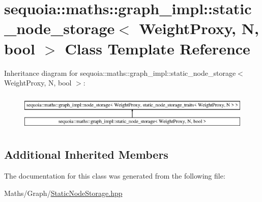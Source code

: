 \hypertarget{classsequoia_1_1maths_1_1graph__impl_1_1static__node__storage}{}\section{sequoia\+::maths\+::graph\+\_\+impl\+::static\+\_\+node\+\_\+storage$<$ Weight\+Proxy, N, bool $>$ Class Template Reference}
\label{classsequoia_1_1maths_1_1graph__impl_1_1static__node__storage}
Inheritance diagram for sequoia\+::maths\+::graph\+\_\+impl\+::static\+\_\+node\+\_\+storage$<$ Weight\+Proxy, N, bool $>$\+:\begin{figure}[H]
\begin{center}
\leavevmode
\includegraphics[height=1.818182cm]{classsequoia_1_1maths_1_1graph__impl_1_1static__node__storage}
\end{center}
\end{figure}
\subsection*{Additional Inherited Members}


The documentation for this class was generated from the following file\+:\begin{DoxyCompactItemize}
\item 
Maths/\+Graph/\mbox{\hyperlink{_static_node_storage_8hpp}{Static\+Node\+Storage.\+hpp}}\end{DoxyCompactItemize}
